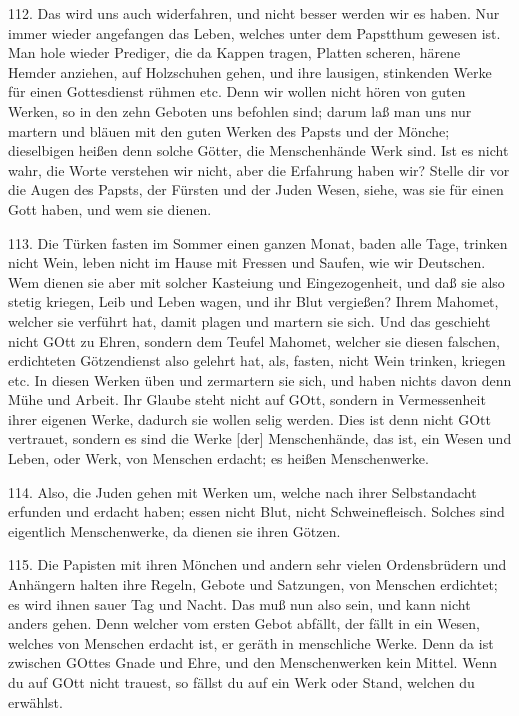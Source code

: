 112. Das wird uns auch widerfahren, und nicht besser werden wir es haben. Nur immer wieder angefangen das Leben, welches unter dem Papstthum gewesen ist. Man hole wieder Prediger, die da Kappen tragen, Platten scheren, härene Hemder anziehen, auf Holzschuhen gehen, und ihre lausigen, stinkenden Werke für einen Gottesdienst rühmen etc. Denn wir wollen nicht hören von guten Werken, so in den zehn Geboten uns befohlen sind; darum laß man uns nur martern und bläuen mit den guten Werken des Papsts und der Mönche; dieselbigen heißen denn solche Götter, die Menschenhände Werk sind. Ist es nicht wahr, die Worte verstehen wir nicht, aber die Erfahrung haben wir? Stelle dir vor die Augen des Papsts, der Fürsten und der Juden Wesen, siehe, was sie für einen Gott haben, und wem sie dienen.

113. Die Türken fasten im Sommer einen ganzen Monat, baden alle Tage, trinken nicht Wein, leben nicht im Hause mit Fressen und Saufen, wie wir Deutschen. Wem dienen sie aber mit solcher Kasteiung und Eingezogenheit, und daß sie also stetig kriegen, Leib und Leben wagen, und ihr Blut vergießen? Ihrem Mahomet, welcher sie verführt hat, damit plagen und martern sie sich. Und das geschieht nicht GOtt zu Ehren, sondern dem Teufel Mahomet, welcher sie diesen falschen, erdichteten Götzendienst also gelehrt hat, als, fasten, nicht Wein trinken, kriegen etc. In diesen Werken üben und zermartern sie sich, und haben nichts davon denn Mühe und Arbeit. Ihr Glaube steht nicht auf GOtt, sondern in Vermessenheit ihrer eigenen Werke, dadurch sie wollen selig werden. Dies ist denn nicht GOtt vertrauet, sondern es sind die Werke [der] Menschenhände, das ist, ein Wesen und Leben, oder Werk, von Menschen erdacht; es heißen Menschenwerke.

114. Also, die Juden gehen mit Werken um, welche nach ihrer Selbstandacht erfunden und erdacht haben; essen nicht Blut, nicht Schweinefleisch. Solches sind eigentlich Menschenwerke, da dienen sie ihren Götzen.

115. Die Papisten mit ihren Mönchen und andern sehr vielen Ordensbrüdern und Anhängern halten ihre Regeln, Gebote und Satzungen, von Menschen erdichtet; es wird ihnen sauer Tag und Nacht. Das muß nun also sein, und kann nicht anders gehen. Denn welcher vom ersten Gebot abfällt, der fällt in ein Wesen, welches von Menschen erdacht ist, er geräth in menschliche Werke. Denn da ist zwischen GOttes Gnade und Ehre, und den Menschenwerken kein Mittel. Wenn du auf GOtt nicht trauest, so fällst du auf ein Werk oder Stand, welchen du erwählst.

